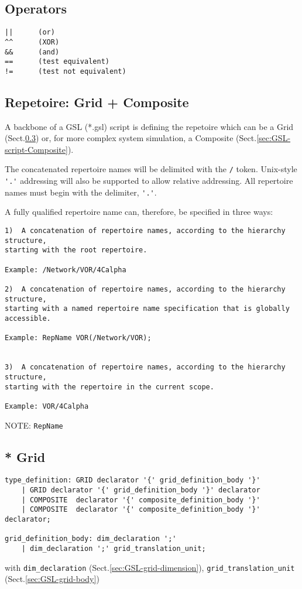 \subsection{Operators}

\begin{verbatim}
||      (or)
^^      (XOR)
&&      (and)
==      (test equivalent)
!=      (test not equivalent)

\end{verbatim}


\subsection{Repetoire: Grid + Composite}
\label{sec:GSL-repertoire}

A backbone of a GSL (*.gsl) script is defining the repetoire
which can be a Grid (Sect.\ref{sec:GSL-repertoire-grid}) or, for more complex system
simulation, a Composite (Sect.\ref{sec:GSL-script-Composite}).

The concatenated repertoire names will be delimited with the \verb!/! token.
Unix-style \verb!'.'! addressing will also be supported to allow relative
addressing. All repertoire names must begin with the delimiter, \verb!'.'!.

A fully qualified repertoire name can, therefore, be specified in three ways:
\begin{verbatim}
1)	A concatenation of repertoire names, according to the hierarchy structure,
starting with the root repertoire. 

Example: /Network/VOR/4Calpha

2)	A concatenation of repertoire names, according to the hierarchy structure,
starting with a named repertoire name specification that is globally accessible. 

Example: RepName VOR(/Network/VOR);


3)	A concatenation of repertoire names, according to the hierarchy structure,
starting with the repertoire in the current scope. 

Example: VOR/4Calpha
\end{verbatim}

NOTE: \verb!RepName!

\subsection{* Grid}
\label{sec:GSL-repertoire-grid}

\begin{verbatim}
type_definition: GRID declarator '{' grid_definition_body '}'  
	| GRID declarator '{' grid_definition_body '}' declarator 
    | COMPOSITE  declarator '{' composite_definition_body '}' 
    | COMPOSITE  declarator '{' composite_definition_body '}' declarator;

grid_definition_body: dim_declaration ';'
    | dim_declaration ';' grid_translation_unit;
\end{verbatim}
with \verb!dim_declaration! (Sect.\ref{sec:GSL-grid-dimension}),
\verb!grid_translation_unit! (Sect.\ref{sec:GSL-grid-body})

